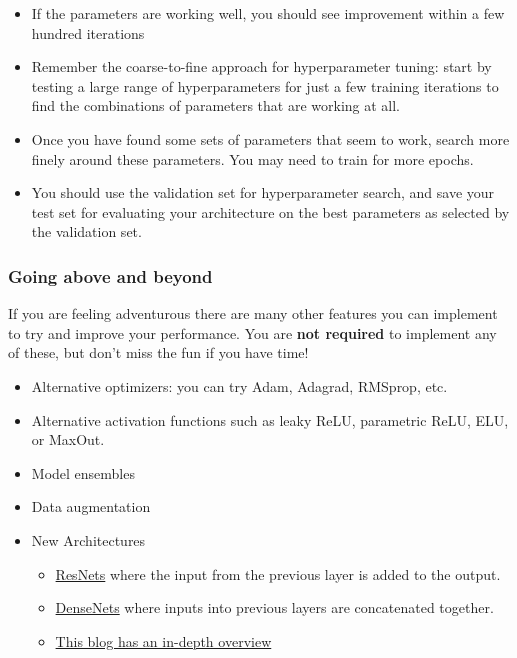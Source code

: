 \documentclass[11pt]{article}
\providecommand{\tightlist}{%
      \setlength{\itemsep}{0pt}\setlength{\parskip}{0pt}}
\begin{document}
\begin{itemize}
\tightlist
\item
  If the parameters are working well, you should see improvement within
  a few hundred iterations
\item
  Remember the coarse-to-fine approach for hyperparameter tuning: start
  by testing a large range of hyperparameters for just a few training
  iterations to find the combinations of parameters that are working at
  all.
\item
  Once you have found some sets of parameters that seem to work, search
  more finely around these parameters. You may need to train for more
  epochs.
\item
  You should use the validation set for hyperparameter search, and save
  your test set for evaluating your architecture on the best parameters
  as selected by the validation set.
\end{itemize}

\hypertarget{going-above-and-beyond}{%
\subsubsection{Going above and beyond}\label{going-above-and-beyond}}

If you are feeling adventurous there are many other features you can
implement to try and improve your performance. You are \textbf{not
required} to implement any of these, but don't miss the fun if you have
time!

\begin{itemize}
\tightlist
\item
  Alternative optimizers: you can try Adam, Adagrad, RMSprop, etc.
\item
  Alternative activation functions such as leaky ReLU, parametric ReLU,
  ELU, or MaxOut.
\item
  Model ensembles
\item
  Data augmentation
\item
  New Architectures

  \begin{itemize}
  \tightlist
  \item
    \href{https://arxiv.org/abs/1512.03385}{ResNets} where the input
    from the previous layer is added to the output.
  \item
    \href{https://arxiv.org/abs/1608.06993}{DenseNets} where inputs into
    previous layers are concatenated together.
  \item
    \href{https://chatbotslife.com/resnets-highwaynets-and-densenets-oh-my-9bb15918ee32}{This
    blog has an in-depth overview}
  \end{itemize}
\end{itemize}
\end{document}

